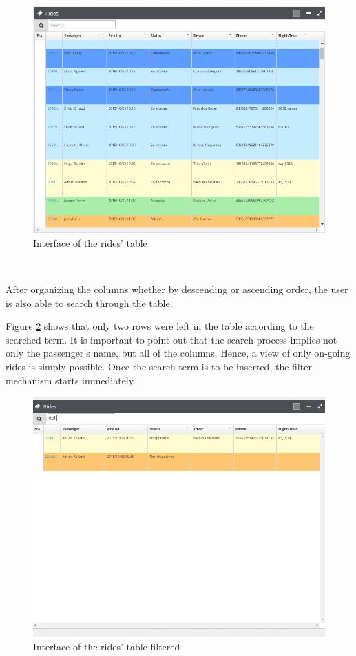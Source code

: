 \begin{figure}[!htbp] 
\begin{center}
\includegraphics[width=6 in]{images/achievement/3.png}
\caption{Interface of the rides' table}
\label{int3}
\end{center}
\end{figure}~


After organizing the columns whether by descending or ascending order, the user is also able to search through the table.

Figure \ref{int4} shows that only two rows were left in the table according to the searched term. It is important to point out that the search process implies not only the passenger's name, but all of the columns. 
Hence, a view of only on-going rides is simply possible. Once the search term is to be inserted, the filter mechanism starts immediately.

\begin{figure}[!htbp] 
\begin{center}
\includegraphics[width=4.5 in]{images/achievement/4.png}
\caption{Interface of the rides' table filtered }
\label{int4}
\end{center}
\end{figure}~



